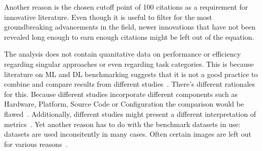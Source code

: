
Another reason is the chosen cutoff point of 100 citations as a requirement for innovative literature.
Even though it is useful to filter for the most groundbreaking advancements in the field,
newer innovations that have not been revealed long enough to earn enough citations might be left
out of the equation.

The analysis does not contain quanitative data on performance or efficiency regarding
singular approaches or even regarding task categories.
This is because literature on \ac{ML} and \ac{DL} benchmarking suggests that it is not a good
practice to combine and compare results from different
studies~\citep{baek_what_2019,arpteg_software_2018,long_scene_2021}.
There's different rationales for this.
Because different studies incorporate different components such as Hardware, Platform, Source Code
or Configuration the comparison would be flawed~\citep{arpteg_software_2018,baek_what_2019}.
Additionally, different studies might present a different interpretation of
metrics~\citep{long_scene_2021}.
Yet another reason has to do with the benchmark datasets in use: datasets are used inconsitently in
many cases.
Often certain images are left out for various reasons~\citep{baek_what_2019}.
